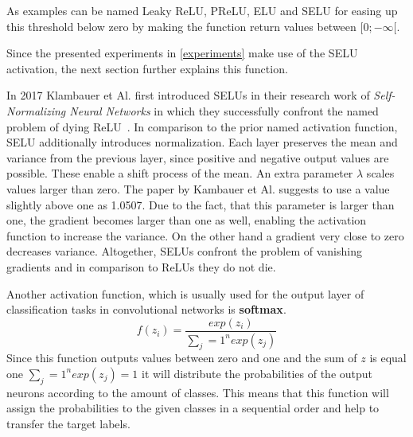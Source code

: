 As examples can be named Leaky ReLU, \gls{PReLU}, \gls{ELU} and \gls{SELU} for easing up this threshold
below zero by making the function return values between
$[0;-\infty[$.

Since the presented experiments in \autoref{experiments} make use of the \gls{SELU} activation,
the next section further explains this function.


In 2017 Klambauer et Al. first introduced \glspl{SELU} in their research work of
\textit{Self-Normalizing Neural Networks} in which they successfully confront the named problem of dying
\gls{ReLU}~\cite{seluorigin}.
In comparison to the prior named activation function, \gls{SELU} additionally introduces normalization.
Each layer preserves the mean and variance from the previous layer, since positive and negative output values
are possible. These enable a shift process of the mean.
An extra parameter $\lambda$ scales values larger than zero.
The paper by Kambauer et Al. suggests to use a value slightly above one as 1.0507.
Due to the fact, that this parameter is larger than one, the gradient becomes larger than one as well, enabling
the activation function to increase the variance.
On the other hand a gradient very close to zero decreases variance.
Altogether, \glspl{SELU} confront the problem of vanishing gradients and in comparison to \glspl{ReLU} they do
not die.

Another activation function, which is usually used for the output layer of classification tasks in
convolutional networks is \textbf{softmax}.
\begin{equation}
    f(z_i)=\frac{exp(z_i)}{\sum_j=1^n exp(z_j)}
\end{equation}
Since this function outputs values between zero and one and the sum of $z$ is equal one $\sum_j=1^n exp(z_j)=1$
it will distribute the probabilities of the output neurons according to the amount of classes.
This means that this function will assign the probabilities to the given classes in a sequential order and help
to transfer the target labels.


